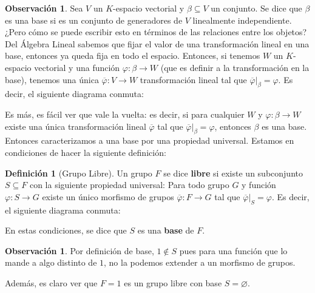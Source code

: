 \documentclass[12pt]{book}
\theoremstyle{definition}
\newtheorem{obs}[teo]{Observación}
\newtheorem{defn}[teo]{Definición}
\let\emptyset\varnothing
\begin{document}
\begin{obs}
Sea $V$ un $K$-espacio vectorial y $\beta\subseteq V$ un conjunto. Se dice que $\beta$ es una base si es un conjunto de generadores de $V$ linealmente independiente. ¿Pero cómo se puede escribir esto en términos de las relaciones entre los objetos? Del Álgebra Lineal sabemos que fijar el valor de una transformación lineal en una base, entonces ya queda fija en todo el espacio. Entonces, si tenemos $W$ un $K$-espacio vectorial y una función $\varphi:\beta \to W$ (que es definir a la transformación en la base), tenemos una única $\overline{\varphi}:V\to W$ transformación lineal tal que $\left.\overline{\varphi}\right |_{\beta} = \varphi$. Es decir, el siguiente diagrama conmuta:
\begin{center}
\end{center}

Es más, es fácil ver que vale la vuelta: es decir, si para cualquier $W$ y $\varphi :\beta\to W$ existe una única transformación lineal $\overline{\varphi}$ tal que $\left. \overline{\varphi} \right |_{\beta} = \varphi$, entonces $\beta$ es una base. Entonces caracterizamos a una base por una propiedad universal. Estamos en condiciones de hacer la siguiente definición:
\end{obs}

\begin{defn}[Grupo Libre] Un grupo $F$ se dice \textbf{libre} si existe un subconjunto $S\subseteq F$ con la siguiente propiedad universal: Para todo grupo $G$ y función $\varphi : S\to G$ existe un único morfismo de grupos $\overline{\varphi}:F\to G$ tal que $\left.\overline{\varphi}\right |_{S}=\varphi$. Es decir, el siguiente diagrama conmuta:
\begin{center}
\end{center}
En estas condiciones, se dice que $S$ es una \textbf{base} de $F$.
\end{defn}
\begin{obs}
Por definición de base, $1\notin S$ pues para una función que lo mande a algo distinto de $1$, no la podemos extender a un morfismo de grupos.

Además, es claro ver que $F=1$ es un grupo libre con base $S=\emptyset$.
\end{obs}
\end{document}
